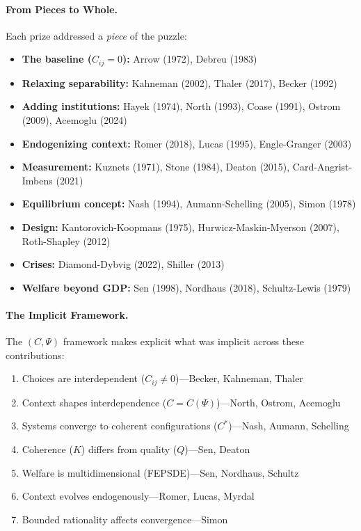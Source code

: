 \documentclass[12pt,a4paper]{article}
\begin{document}
\paragraph{From Pieces to Whole.}
Each prize addressed a \emph{piece} of the puzzle:
\begin{itemize}
  \item \textbf{The baseline ($C_{ij} = 0$):} Arrow (1972), Debreu (1983)
  \item \textbf{Relaxing separability:} Kahneman (2002), Thaler (2017), Becker (1992)
  \item \textbf{Adding institutions:} Hayek (1974), North (1993), Coase (1991), Ostrom (2009), Acemoglu (2024)
  \item \textbf{Endogenizing context:} Romer (2018), Lucas (1995), Engle-Granger (2003)
  \item \textbf{Measurement:} Kuznets (1971), Stone (1984), Deaton (2015), Card-Angrist-Imbens (2021)
  \item \textbf{Equilibrium concept:} Nash (1994), Aumann-Schelling (2005), Simon (1978)
  \item \textbf{Design:} Kantorovich-Koopmans (1975), Hurwicz-Maskin-Myerson (2007), Roth-Shapley (2012)
  \item \textbf{Crises:} Diamond-Dybvig (2022), Shiller (2013)
  \item \textbf{Welfare beyond GDP:} Sen (1998), Nordhaus (2018), Schultz-Lewis (1979)
\end{itemize}

\paragraph{The Implicit Framework.}
The $(C, \Psi)$ framework makes explicit what was implicit across these contributions:
\begin{enumerate}
  \item Choices are interdependent ($C_{ij} \neq 0$)---Becker, Kahneman, Thaler
  \item Context shapes interdependence ($C = C(\Psi)$)---North, Ostrom, Acemoglu
  \item Systems converge to coherent configurations ($C^*$)---Nash, Aumann, Schelling
  \item Coherence ($K$) differs from quality ($Q$)---Sen, Deaton
  \item Welfare is multidimensional (FEPSDE)---Sen, Nordhaus, Schultz
  \item Context evolves endogenously---Romer, Lucas, Myrdal
  \item Bounded rationality affects convergence---Simon
\end{enumerate}
\end{document}
